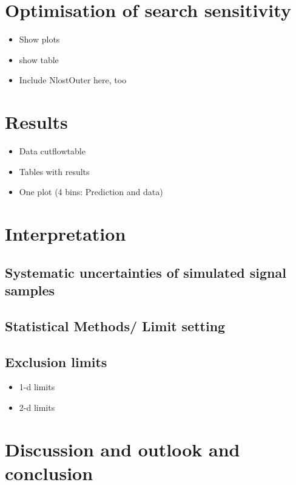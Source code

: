 \chapter{Optimisation of search sensitivity}
\label{sec:Optimisation}
\begin{itemize}
\item Show plots
\item show table
\item Include NlostOuter here, too
\end{itemize}


\chapter{Results}
\label{sec:Results}
\begin{itemize}
\item Data cutflowtable
\item Tables with results
\item One plot (4 bins: Prediction and data)
\end{itemize}


\chapter{Interpretation}
\label{sec:Interpretation}
\section{Systematic uncertainties of simulated signal samples}
\section{Statistical Methods/ Limit setting}
\section{Exclusion limits}
\begin{itemize}
\item 1-d limits
\item 2-d limits
\end{itemize}


\chapter{Discussion and outlook and conclusion}
\label{sec:Discussion}
